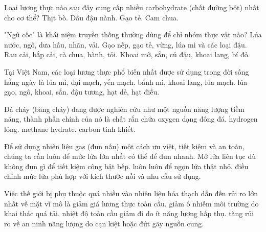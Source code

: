 \begin{ex}
    Loại lương thực nào sau đây cung cấp nhiều carbohydrate (chất đường bột) nhất cho cơ thể?
    \choice
        {Thịt bò.}
        {Dầu đậu nành.}
        {\True Gạo tẻ.}
        {Cam chua.}
\end{ex}

\begin{ex}
    "Ngũ cốc" là khái niệm truyền thống thường dùng để chỉ nhóm thực vật nào?
    \choice
        {Lúa nước, ngô, dưa hấu, nhãn, vải.}
        {\True Gạo nếp, gạo tẻ, vừng, lúa mì và các loại đậu.}
        {Rau cải, bắp cải, cà chua, hành, tỏi.}
        {Khoai mỡ, sắn, củ đậu, khoai lang, bí đỏ.}
\end{ex}

\begin{ex}
    Tại Việt Nam, các loại lương thực phổ biến nhất được sử dụng trong đời sống hằng ngày là
    \choice
        {lúa mì, đại mạch, yến mạch.}
        {bánh mì, khoai lang, lúa mạch.}
        {\True lúa gạo, ngô, khoai, sắn.}
        {đậu tương, hạt dẻ, hạt điều.}
\end{ex}

\begin{ex}
    Đá cháy (băng cháy) đang được nghiên cứu như một nguồn năng lượng tiềm năng, thành phần chính của nó là
    \choice
        {chất rắn chứa oxygen dạng đông đá.}
        {hydrogen lỏng.}
        {\True methane hydrate.}
        {carbon tinh khiết.}
\end{ex}

\begin{ex}
    Để sử dụng nhiên liệu gas (đun nấu) một cách ưu việt, tiết kiệm và an toàn, chúng ta cần
    \choice
        {luôn để mức lửa lớn nhất có thể để đun nhanh.}
        {Mở lửa liên tục dù không đun gì để tiết kiệm công bật bếp.}
        {luôn luôn để ngọn lửa thật nhỏ.}
        {\True điều chỉnh mức lửa phù hợp với kích thước nồi và nhu cầu sử dụng.}
\end{ex}

\begin{ex}
    Việc thế giới bị phụ thuộc quá nhiều vào nhiên liệu hóa thạch dẫn đến rủi ro lớn nhất về mặt vĩ mô là
    \choice
        {giảm giá lương thực toàn cầu.}
        {giảm ô nhiễm môi trường do khai thác quá tải.}
        {nhiệt độ toàn cầu giảm đi do ít năng lượng hấp thụ.}
        {\True tăng rủi ro về an ninh năng lượng do cạn kiệt hoặc đứt gãy nguồn cung.}
\end{ex}

